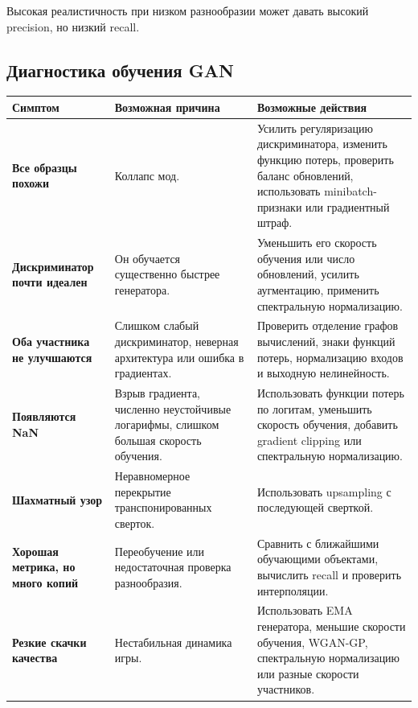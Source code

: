 \documentclass[12pt,a4paper]{article}
\numberwithin{equation}{section}
\theoremstyle{definition}
\theoremstyle{remark}
\begin{document}
Высокая реалистичность при низком разнообразии может давать высокий
precision, но низкий recall.

\subsection{Диагностика обучения GAN}

\begin{center}
\begin{tabularx}{\textwidth}{
    >{\bfseries}p{3.3cm}
    X
    X
}
\toprule
Симптом & Возможная причина & Возможные действия\\
\midrule

Все образцы похожи
&
Коллапс мод.
&
Усилить регуляризацию дискриминатора, изменить функцию потерь,
проверить баланс обновлений, использовать minibatch-признаки или
градиентный штраф.\\

Дискриминатор почти идеален
&
Он обучается существенно быстрее генератора.
&
Уменьшить его скорость обучения или число обновлений, усилить
аугментацию, применить спектральную нормализацию.\\

Оба участника не улучшаются
&
Слишком слабый дискриминатор, неверная архитектура или ошибка в
градиентах.
&
Проверить отделение графов вычислений, знаки функций потерь,
нормализацию входов и выходную нелинейность.\\

Появляются NaN
&
Взрыв градиента, численно неустойчивые логарифмы, слишком большая
скорость обучения.
&
Использовать функции потерь по логитам, уменьшить скорость обучения,
добавить gradient clipping или спектральную нормализацию.\\

Шахматный узор
&
Неравномерное перекрытие транспонированных сверток.
&
Использовать upsampling с последующей сверткой.\\

Хорошая метрика, но много копий
&
Переобучение или недостаточная проверка разнообразия.
&
Сравнить с ближайшими обучающими объектами, вычислить recall и
проверить интерполяции.\\

Резкие скачки качества
&
Нестабильная динамика игры.
&
Использовать EMA генератора, меньшие скорости обучения, WGAN-GP,
спектральную нормализацию или разные скорости участников.\\
\bottomrule
\end{tabularx}
\end{center}
\end{document}
